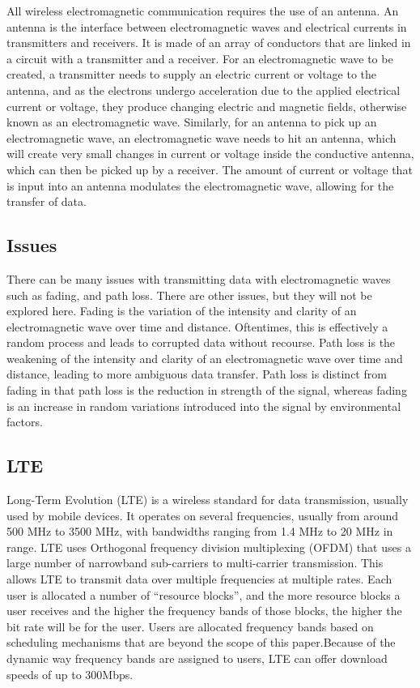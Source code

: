 \documentclass[11pt]{article}
\begin{document}
All wireless electromagnetic communication requires the use of an antenna. An antenna is the interface between electromagnetic waves and electrical currents in transmitters and receivers. It is made of an array of conductors that are linked in a circuit with a transmitter and a receiver. For an electromagnetic wave to be created, a transmitter needs to supply an electric current or voltage to the antenna, and as the electrons undergo acceleration due to the applied electrical current or voltage, they produce changing electric and magnetic fields, otherwise known as an electromagnetic wave. Similarly, for an antenna to pick up an electromagnetic wave, an electromagnetic wave needs to hit an antenna, which will create very small changes in current or voltage inside the conductive antenna, which can then be picked up by a receiver. The amount of current or voltage that is input into an antenna modulates the electromagnetic wave, allowing for the transfer of data.

\subsection{Issues}

There can be many issues with transmitting data with electromagnetic waves such as fading, and path loss. There are other issues, but they will not be explored here. Fading is the variation of the intensity and clarity of an electromagnetic wave over time and distance. Oftentimes, this is effectively a random process and leads to corrupted data without recourse. Path loss is the weakening of the intensity and clarity of an electromagnetic wave over time and distance, leading to more ambiguous data transfer. Path loss is distinct from fading in that path loss is the reduction in strength of the signal, whereas fading is an increase in random variations introduced into the signal by environmental factors. 

\subsection{LTE}

Long-Term Evolution (LTE) is a wireless standard for data transmission, usually used by mobile devices. It operates on several frequencies, usually from around 500 MHz to 3500 MHz, with bandwidths ranging from 1.4 MHz to 20 MHz in range. LTE uses Orthogonal frequency division multiplexing (OFDM) that uses a large number of narrowband sub-carriers to multi-carrier transmission. This allows LTE to transmit data over multiple frequencies at multiple rates. Each user is allocated a number of “resource blocks”, and the more resource blocks a user receives and the higher the frequency bands of those blocks, the higher the bit rate will be for the user. Users are allocated frequency bands based on scheduling mechanisms that are beyond the scope of this paper.Because of the dynamic way frequency bands are assigned to users, LTE can offer download speeds of up to 300Mbps.
\end{document}
